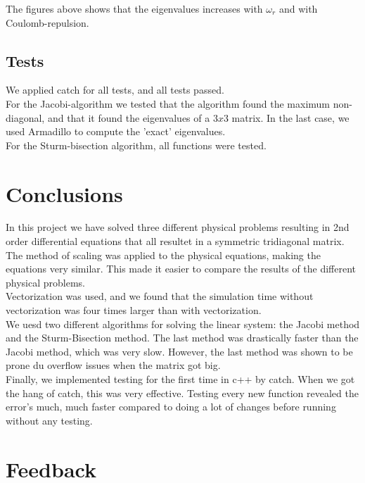 \documentclass{article}
\begin{document}
The figures above shows that the eigenvalues increases with $\omega_r$ and with Coulomb-repulsion.

\subsection{Tests}
We applied catch for all tests, and all tests passed. \\

For the Jacobi-algorithm we tested that the algorithm found the maximum non-diagonal, and that it found the eigenvalues of a $3 x 3$ matrix. In the last case, we used Armadillo to compute the 'exact' eigenvalues.\\

For the Sturm-bisection algorithm, all functions were tested.

\section{Conclusions}
In this project we have solved three different physical problems resulting in 2nd order differential equations that all resultet in a symmetric tridiagonal matrix. \\

The method of scaling was applied to the physical equations, making the equations very similar. This made it easier to compare the results of the different physical problems. \\

Vectorization was used, and we found that the simulation time without vectorization was four times larger than with vectorization.\\

We uesd two different algorithms for solving the linear system: the Jacobi method and the Sturm-Bisection method. The last method was drastically faster than the Jacobi method, which was very slow. However, the last method was shown to be prone du overflow issues when the matrix got big.\\

Finally, we implemented testing for the first time in c++ by catch. When we got the hang of catch, this was very effective. Testing every new function revealed the error's much, much faster compared to doing a lot of changes before running without any testing.




\section{Feedback}
\end{document}
